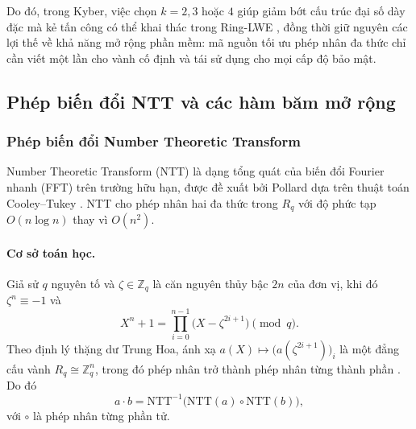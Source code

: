 \documentclass[../LuanVan.tex]{subfiles}
\begin{document}
Do đó, trong Kyber, việc chọn $k=2, 3$ hoặc $4$ giúp giảm bớt cấu trúc đại số dày đặc mà kẻ tấn công có thể khai thác trong Ring-LWE \cite{Bos18}, đồng thời giữ nguyên các lợi thế về khả năng mở rộng phần mềm: mã nguồn tối ưu phép nhân đa thức chỉ cần viết một lần cho vành cố định và tái sử dụng cho mọi cấp độ bảo mật.

\subsection{Phép biến đổi NTT và các hàm băm mở rộng}\label{subsec:ntt-hash}

\subsubsection{Phép biến đổi Number Theoretic Transform}\label{subsec:ntt}

Number Theoretic Transform (NTT) là dạng tổng quát của biến đổi Fourier nhanh (FFT) trên trường hữu hạn, được đề xuất bởi Pollard \cite{Pollard71} dựa trên thuật toán Cooley--Tukey \cite{CooleyTukey65}. NTT cho phép nhân hai đa thức trong $R_q$ với độ phức tạp $O(n\log n)$ thay vì $O(n^2)$.

\paragraph{Cơ sở toán học.} Giả sử $q$ nguyên tố và $\zeta\in\mathbb{Z}_q$ là căn nguyên thủy bậc $2n$ của đơn vị, khi đó $\zeta^n\equiv -1$ và
\begin{equation}
    X^n + 1 = \prod_{i=0}^{n-1} \bigl(X - \zeta^{2i+1}\bigr) \pmod q .
\end{equation}
Theo định lý thặng dư Trung Hoa, ánh xạ $a(X)\mapsto \bigl(a(\zeta^{2i+1})\bigr)_{i}$ là một đẳng cấu vành $R_q\cong \mathbb{Z}_q^n$, trong đó phép nhân trở thành phép nhân từng thành phần \cite{LyubashevskyPR13,Longa16}. Do đó
\begin{equation}
    a\cdot b = \mathrm{NTT}^{-1}\bigl(\mathrm{NTT}(a)\circ \mathrm{NTT}(b)\bigr),
\end{equation}
với $\circ$ là phép nhân từng phần tử.
\end{document}
